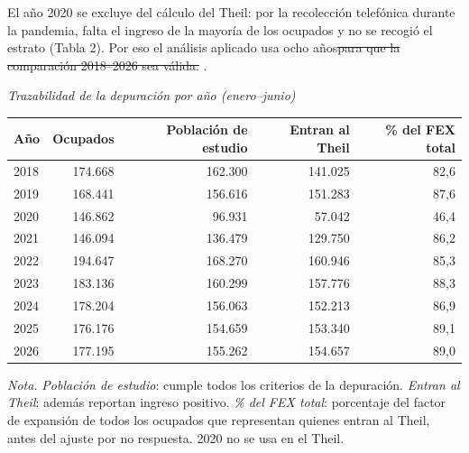 \documentclass[12pt,letterpaper]{article}
\providecommand{\DIFaddtex}[1]{{\protect\color{BLUE}#1}} %
\providecommand{\DIFdeltex}[1]{{\protect\color{RED}\sout{#1}}} %
\providecommand{\DIFaddtex}[1]{\texorpdfstring{\DIFaddtex{#1}}{#1}} %
\providecommand{\DIFdeltex}[1]{\texorpdfstring{\DIFdeltex{#1}}{}} %
\providecommand{\DIFaddbegin}{}\providecommand{\DIFaddend}{} %
\providecommand{\DIFdelbegin}{}\providecommand{\DIFdelend}{} %
\providecommand{\DIFadd}[1]{\texorpdfstring{\DIFaddtex{#1}}{#1}} %
\providecommand{\DIFdel}[1]{\texorpdfstring{\DIFdeltex{#1}}{}} %
\begin{document}
\DIFadd{El año 2020 se excluye del cálculo del Theil: por la recolección telefónica durante la pandemia, falta el ingreso de la mayoría de los ocupados y no se recogió el estrato (Tabla 2). Por eso el análisis aplicado usa ocho }\DIFaddend años\DIFdelbegin \DIFdel{para que la comparación 2018--2026 sea válida.
}%
\DIFdelend \DIFaddbegin \DIFadd{.
}

\begin{table}[H]
  \singlespacing
  \raggedright
  \color{BLUE}{\bfseries Tabla 2 --- nueva\par}
  \vspace{0.5\baselineskip}
  {\itshape Trazabilidad de la depuración por año (enero--junio)\par}
  \vspace{0.5\baselineskip}
  \small
  \renewcommand{\arraystretch}{1.25}
  \begin{tabular}{@{}lrrrr@{}}
    \toprule
    Año & Ocupados & Población de estudio & Entran al Theil & \% del FEX total \\
    \midrule
    2018 & 174.668 & 162.300 & 141.025 & 82,6 \\
    2019 & 168.441 & 156.616 & 151.283 & 87,6 \\
    2020 & 146.862 &  96.931 &  57.042 & 46,4 \\
    2021 & 146.094 & 136.479 & 129.750 & 86,2 \\
    2022 & 194.647 & 168.270 & 160.946 & 85,3 \\
    2023 & 183.136 & 160.299 & 157.776 & 88,3 \\
    2024 & 178.204 & 156.063 & 152.213 & 86,9 \\
    2025 & 176.176 & 154.659 & 153.340 & 89,1 \\
    2026 & 177.195 & 155.262 & 154.657 & 89,0 \\
    \bottomrule
  \end{tabular}

  \vspace{0.3\baselineskip}
  {\itshape Nota.} \emph{Población de estudio}: cumple todos los criterios de la depuración. \emph{Entran al Theil}: además reportan ingreso positivo. \emph{\% del FEX total}: porcentaje del factor de expansión de todos los ocupados que representan quienes entran al Theil, antes del ajuste por no respuesta. 2020 no se usa en el Theil.
\end{table}
\DIFaddend 
\end{document}
